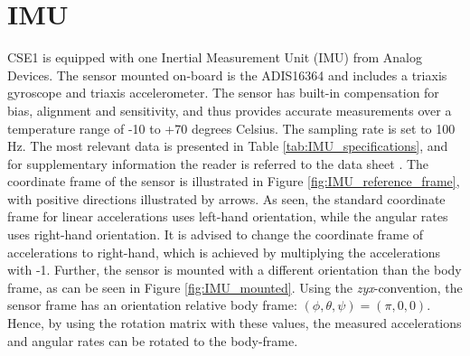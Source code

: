 \section{IMU}
CSE1 is equipped with one Inertial Measurement Unit (IMU) from Analog Devices. The sensor mounted on-board is the ADIS16364 and includes a triaxis gyroscope and triaxis accelerometer. The sensor has built-in compensation for bias, alignment and sensitivity, and thus provides accurate measurements over a temperature range of -10 to +70 degrees Celsius. The sampling rate is set to 100 Hz. The most relevant data is presented in Table \ref{tab:IMU_specifications}, and for supplementary information the reader is referred to the data sheet \cite{adis16364}. The coordinate frame of the sensor is illustrated in Figure \ref{fig:IMU_reference_frame}, with positive directions illustrated by arrows. As seen, the standard coordinate frame for linear accelerations uses left-hand orientation, while the angular rates uses right-hand orientation. It is advised to change the coordinate frame of accelerations to right-hand, which is achieved by multiplying the accelerations with -1. Further, the sensor is mounted with a different orientation than the body frame, as can be seen in Figure \ref{fig:IMU_mounted}. Using the \textit{zyx}-convention, the sensor frame has an orientation relative body frame: $(\phi, \theta, \psi) = (\pi, 0, 0)$. Hence, by using the rotation matrix with these values, the measured accelerations and angular rates can be rotated to the body-frame. 
